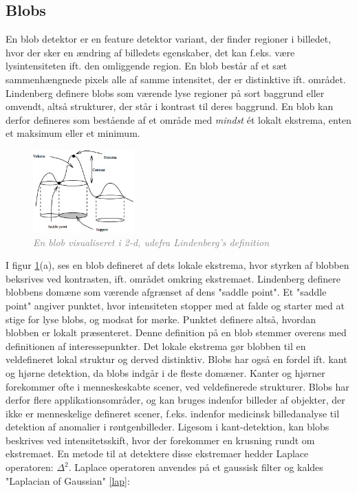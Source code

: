 \subsection{Blobs}
En blob detektor er en feature detektor variant, der finder regioner i billedet, hvor der sker en ændring af billedets egenskaber, det kan f.eks. være lysintensiteten ift. den omliggende region. En blob består af et sæt sammenhængnede pixels alle af samme intensitet, der er distinktive ift. området. Lindenberg \cite{blob} definere blobs som værende lyse regioner på sort baggrund eller omvendt, altså strukturer, der står i kontrast til deres baggrund. En blob kan derfor defineres som bestående af et område med \emph{mindst} ét lokalt ekstrema, enten et maksimum eller et minimum.
\begin{figure}[H]
    \centering
    \includegraphics[width=0.35\textwidth]{fig/11.png}
    \vspace{-0.5em}   
    \begin{center}
    \caption{\textcolor{gray}{\footnotesize \textit{
    En blob visualiseret i 2-d, udefra Lindenberg's definition \cite{blob}}}}
    \label{fig:lindblob}
     \end{center}
  \end{figure}
       \vspace{-2.7em}
\noindent
I figur \ref{fig:lindblob}(a), ses en blob defineret af dets lokale ekstrema, hvor styrken af blobben beksrives ved kontrasten, ift. området omkring ekstremaet. Lindenberg definere blobbens domæne som værende afgrænset af dens "saddle point". Et "saddle point" angiver punktet, hvor intensiteten stopper med at falde og starter med at stige for lyse blobs, og modsat for mørke. Punktet definere altså, hvordan blobben er lokalt præsenteret. Denne definition på en blob stemmer overens med definitionen af interessepunkter. Det lokale ekstrema gør blobben til en veldefineret lokal struktur og derved distinktiv. Blobs har også en fordel ift. kant og hjørne detektion, da blobs indgår i de fleste domæner. Kanter og hjørner forekommer ofte i menneskeskabte scener, ved veldefinerede strukturer. Blobs har derfor flere applikationsområder, og kan bruges indenfor billeder af objekter, der ikke er menneskelige defineret scener, f.eks. indenfor medicinsk billedanalyse til detektion af anomalier i røntgenbilleder.  Ligesom i kant-detektion, kan blobs beskrives ved intensitetsskift, hvor der forekommer en krusning rundt om ekstremaet. En metode til at detektere disse ekstremaer hedder Laplace operatoren: $\Delta^2$. Laplace operatoren anvendes på et gaussisk filter og kaldes "Laplacian of Gaussian" \eqref{lap}:
